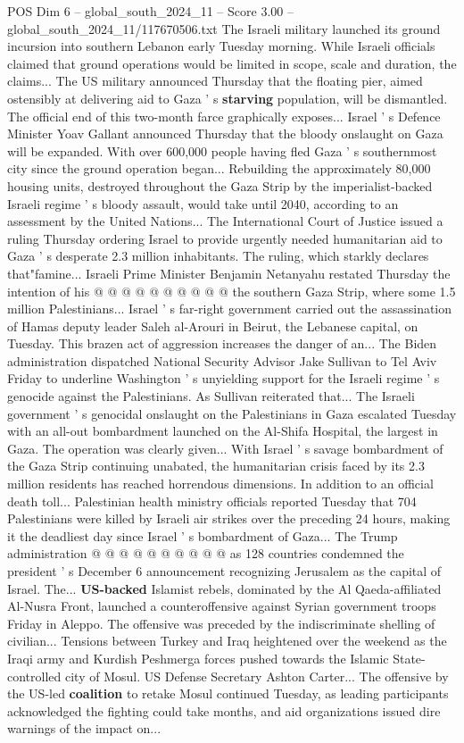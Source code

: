 \begin{textsample}{POS Dim 6 – global\_south\_2024\_11 – Score 3.00 – global\_south\_2024\_11/117670506.txt}  \label{ex:f6_pos_392}
The Israeli military launched its ground incursion into southern Lebanon early Tuesday morning.
While Israeli officials claimed that ground operations would be limited in scope, scale and duration, the claims...
The US military announced Thursday that the floating pier, aimed ostensibly at delivering aid to Gaza ' s \textbf{starving} population, will be dismantled.
The official end of this two-month farce graphically exposes...
Israel ' s Defence Minister Yoav Gallant announced Thursday that the bloody onslaught on Gaza will be expanded.
With over 600,000 people having fled Gaza ' s southernmost city since the ground operation began...
Rebuilding the approximately 80,000 housing units, destroyed throughout the Gaza Strip by the imperialist-backed Israeli regime ' s bloody assault, would take until 2040, according to an assessment by the United Nations...
The International Court of Justice issued a ruling Thursday ordering Israel to provide urgently needed humanitarian aid to Gaza ' s desperate 2.3 million inhabitants.
The ruling, which starkly declares that"famine...
Israeli Prime Minister Benjamin Netanyahu restated Thursday the intention of his @ @ @ @ @ @ @ @ @ @ the southern Gaza Strip, where some 1.5 million Palestinians...
Israel ' s far-right government carried out the assassination of Hamas deputy leader Saleh al-Arouri in Beirut, the Lebanese capital, on Tuesday.
This brazen act of aggression increases the danger of an...
The Biden administration dispatched National Security Advisor Jake Sullivan to Tel Aviv Friday to underline Washington ' s unyielding support for the Israeli regime ' s genocide against the Palestinians.
As Sullivan reiterated that...
The Israeli government ' s genocidal onslaught on the Palestinians in Gaza escalated Tuesday with an all-out bombardment launched on the Al-Shifa Hospital, the largest in Gaza.
The operation was clearly given...
With Israel ' s savage bombardment of the Gaza Strip continuing unabated, the humanitarian crisis faced by its 2.3 million residents has reached horrendous dimensions.
In addition to an official death toll...
Palestinian health ministry officials reported Tuesday that 704 Palestinians were killed by Israeli air strikes over the preceding 24 hours, making it the deadliest day since Israel ' s bombardment of Gaza...
The Trump administration @ @ @ @ @ @ @ @ @ @ as 128 countries condemned the president ' s December 6 announcement recognizing Jerusalem as the capital of Israel.
The... \textbf{US-backed} Islamist rebels, dominated by the Al Qaeda-affiliated Al-Nusra Front, launched a counteroffensive against Syrian government troops Friday in Aleppo.
The offensive was preceded by the indiscriminate shelling of civilian...
Tensions between Turkey and Iraq heightened over the weekend as the Iraqi army and Kurdish Peshmerga forces pushed towards the Islamic State-controlled city of Mosul.
US Defense Secretary Ashton Carter...
The offensive by the US-led \textbf{coalition} to retake Mosul continued Tuesday, as leading participants acknowledged the fighting could take months, and aid organizations issued dire warnings of the impact on...

\end{textsample}
